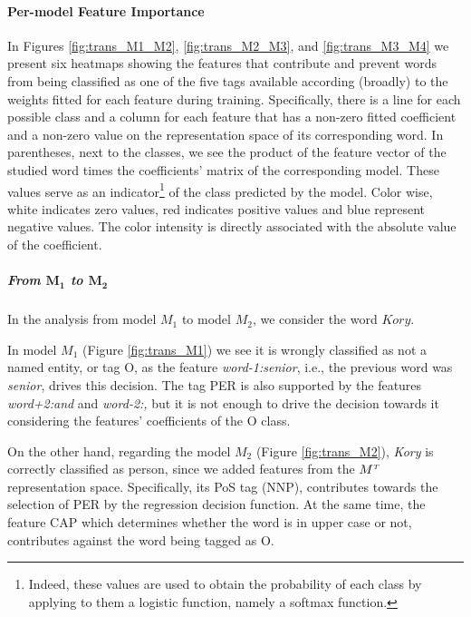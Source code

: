 \paragraph{Per-model Feature Importance}
In Figures \ref{fig:trans_M1_M2}, \ref{fig:trans_M2_M3}, and \ref{fig:trans_M3_M4} we present six heatmaps showing the features that contribute and prevent words from being classified as one of the five tags available according (broadly) to the weights fitted for each feature during training. Specifically, there is a line for each possible class and a column for each feature that has a non-zero fitted coefficient and a non-zero value on the representation space of its corresponding word. In parentheses, next to the classes, we see the product of  the feature vector of the studied word times the coefficients' matrix of the corresponding model. These values serve as an indicator\footnote{Indeed, these values are used to obtain the  probability of each class by applying to them a logistic function, namely a softmax function.} of the class predicted by the model. Color wise,  white indicates zero values, red indicates positive values and blue represent negative values. The color intensity is directly associated with the absolute value of the coefficient.

\subparagraph{From $\mathbf{M_1}$ to $\mathbf{M_2}$} In the analysis from model $M_1$ to model $M_2$, we consider the word $Kory$.

In model $M_1$ (Figure \ref{fig:trans_M1}) we see it is wrongly classified as not a named entity, or tag O, as the feature \textit{word-1:senior}, i.e., the previous word was \textit{senior}, drives this decision. The tag PER is also supported by the features \textit{word+2:and} and \textit{word-2:,} but it is not enough to drive the decision towards it considering the features' coefficients  of the O class.

On the other hand, regarding the model $M_2$ (Figure \ref{fig:trans_M2}), \textit{Kory} is correctly classified  as person, since we added features from the $M^{\scriptscriptstyle T}$ representation space. Specifically, its PoS tag (NNP), contributes towards the selection of PER by the regression decision function. At the same time, the feature CAP which determines whether the word is in upper case or not, contributes against the word being tagged as O.

